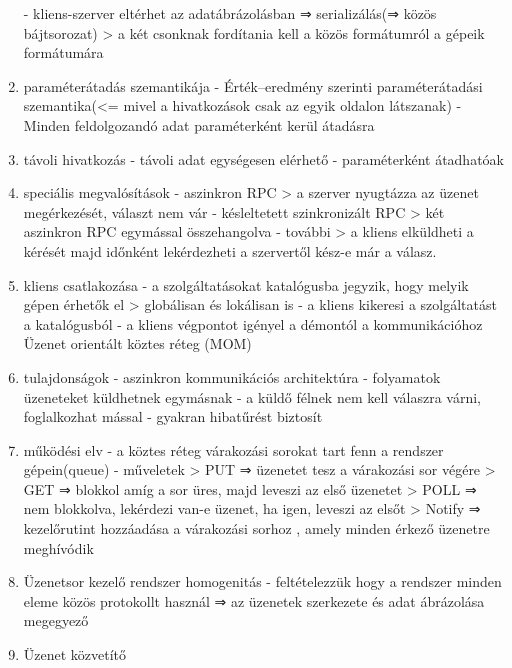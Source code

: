 \documentclass[twoside, a4paper, 12pt]{article}
\begin{document}
\begin{enumerate}
                - kliens-szerver eltérhet az adatábrázolásban ⇒ serializálás(⇒ közös bájtsorozat)
                > a két csonknak fordítania kell a közös formátumról a gépeik formátumára
            \item paraméterátadás szemantikája
                - Érték–eredmény szerinti paraméterátadási szemantika(<=  mivel a hivatkozások csak az egyik oldalon látszanak)
                - Minden feldolgozandó adat paraméterként kerül átadásra
            \item távoli hivatkozás
                - távoli adat egységesen elérhető
                - paraméterként átadhatóak
            \item speciális megvalósítások
                - aszinkron RPC
                > a szerver nyugtázza az üzenet megérkezését, választ nem vár
                - késleltetett szinkronizált RPC
                > két aszinkron RPC egymással összehangolva
                - további
                > a kliens elküldheti a kérését majd időnként lekérdezheti a szervertől kész-e már a válasz.
            \item kliens csatlakozása
                - a szolgáltatásokat katalógusba jegyzik, hogy melyik gépen érhetők el
                > globálisan és lokálisan is
                - a kliens kikeresi a szolgáltatást a katalógusból
                - a kliens végpontot igényel a démontól a kommunikációhoz
                Üzenet orientált köztes réteg (MOM)
            \item tulajdonságok
                - aszinkron kommunikációs architektúra
                - folyamatok üzeneteket küldhetnek egymásnak
                - a küldő félnek nem kell válaszra várni, foglalkozhat mással
                - gyakran hibatűrést biztosít
            \item működési elv
                - a köztes réteg várakozási sorokat tart fenn a rendszer gépein(queue)
                - műveletek
                > PUT    ⇒ üzenetet tesz a várakozási sor végére
                > GET    ⇒ blokkol amíg a sor üres, majd leveszi az első üzenetet
                > POLL 	 ⇒ nem blokkolva, lekérdezi van-e üzenet, ha igen, leveszi az elsőt
                > Notify ⇒	kezelőrutint hozzáadása a várakozási sorhoz , amely minden érkező üzenetre meghívódik
            \item Üzenetsor kezelő rendszer homogenitás
                - feltételezzük hogy a rendszer minden eleme közös protokollt használ
                ⇒ az üzenetek szerkezete és adat ábrázolása megegyező
            \item Üzenet közvetítő

\end{enumerate}
\end{document}
